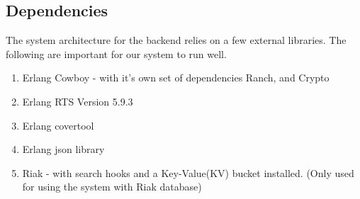 \subsection {Dependencies}

The system architecture for the backend relies on a few external libraries. The following are important for our system to run well. 

\begin {enumerate}
\item Erlang Cowboy - with it's own set of dependencies Ranch, and Crypto
\item Erlang RTS Version 5.9.3
\item Erlang covertool
\item Erlang json library
\item Riak - with search hooks and a Key-Value(KV) bucket installed.
		(Only used for using the system with Riak database)
\end {enumerate}